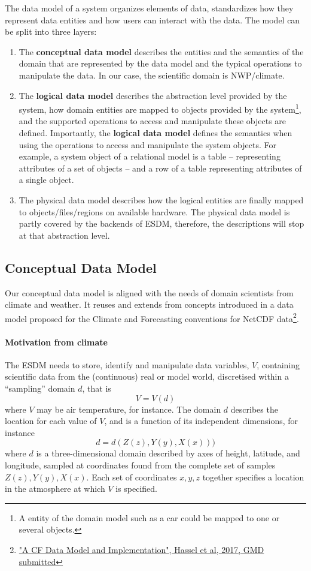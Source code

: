 The data model of a system organizes elements of data, standardizes how they represent data entities and how users can interact with the data.
The model can be split into three layers:
\begin{enumerate}
	\item The \textbf{conceptual data model} describes the entities and the semantics of the domain that are represented by the data model and the typical operations to manipulate the data.
	In our case, the scientific domain is NWP/climate.
	\item The \textbf{logical data model} describes the abstraction level provided by the system, how domain entities are mapped to objects provided by the system\footnote{A entity of the domain model such as a car could be mapped to one or several objects.}, and the supported operations to access and manipulate these objects are defined.
	Importantly, the \textbf{logical data model} defines the semantics when using the operations to access and manipulate the system objects.
	For example, a system object of a relational model is a table -- representing attributes of a set of objects -- and a row of a table representing attributes of a single object.
	\item The physical data model describes how the logical entities are finally mapped to objects/files/regions on available hardware.
	The physical data model is partly covered by the backends of ESDM, therefore, the descriptions will stop at that abstraction level.
\end{enumerate}

\subsection{Conceptual Data Model}
\label{subsec: conceptual data model}

Our conceptual data model is aligned with the needs of domain scientists from climate and weather. It reuses and extends from concepts introduced in a data model proposed for the Climate and Forecasting conventions for NetCDF data\footnote {\url{"A CF Data Model and Implementation", Hassel et al, 2017, GMD submitted}}.

\paragraph{Motivation from climate}



The ESDM needs to store, identify and manipulate data variables,  $V$, containing scientific data from the (continuous) real or model world, discretised within a ``sampling'' domain $d$, that is
\[V=V(d)\]
where $V$ may be air temperature, for instance. The domain $d$ describes the location for each value of $V$, and is a function of its independent dimensions, for instance
\[d = d(Z(z), Y(y), X(x)))\]
where $d$ is a three-dimensional domain described by axes of height, latitude, and longitude, sampled at coordinates found from the complete set of samples $Z(z),Y(y),X(x)$.
Each set of coordinates $x,y,z$  together specifies a location in the atmosphere at which $V$ is specified.



